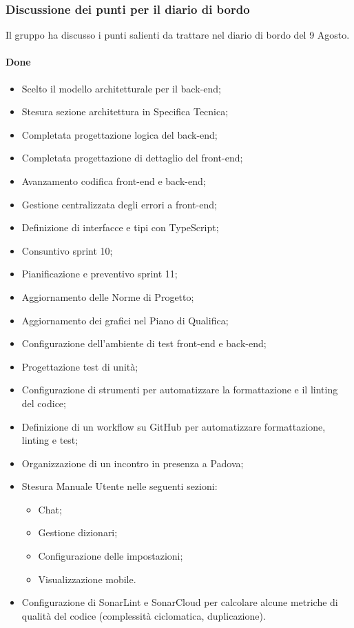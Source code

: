 \subsubsection{Discussione dei punti per il diario di bordo}
\par Il gruppo ha discusso i punti salienti da trattare nel diario di bordo del 9 Agosto.
\paragraph{Done}
\begin{itemize}
	\item Scelto il modello architetturale per il back-end;
	\item Stesura sezione architettura in Specifica Tecnica;
	\item Completata progettazione logica del back-end;
	\item Completata progettazione di dettaglio del front-end;
	\item Avanzamento codifica front-end e back-end;
	\item Gestione centralizzata degli errori a front-end;
	\item Definizione di interfacce e tipi con TypeScript;
	\item Consuntivo sprint 10;
	\item Pianificazione e preventivo sprint 11;
	\item Aggiornamento delle Norme di Progetto;
	\item Aggiornamento dei grafici nel Piano di Qualifica;
	\item Configurazione dell’ambiente di test front-end e back-end;
	\item Progettazione test di unità;
	\item Configurazione di strumenti per automatizzare la formattazione e il linting del codice;
	\item Definizione di un workflow su GitHub per automatizzare formattazione, linting e test;
	\item Organizzazione di un incontro in presenza a Padova;
	\item Stesura Manuale Utente nelle seguenti sezioni:
	\begin{itemize}
		\item Chat;
		\item Gestione dizionari;
		\item Configurazione delle impostazioni;
		\item Visualizzazione mobile.
	\end{itemize}
	\item Configurazione di SonarLint e SonarCloud per calcolare alcune metriche di qualità del codice (complessità ciclomatica, duplicazione).
\end{itemize}

